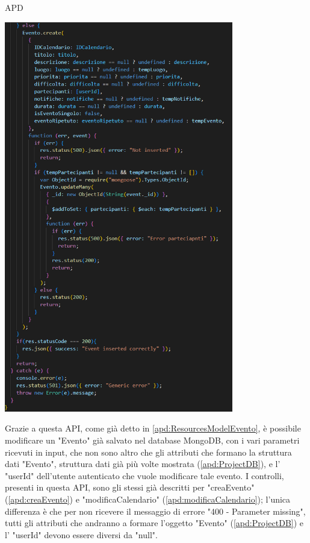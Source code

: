 \begin{listaPersonale} {APD}
\begin{listaPersonale2}[APD]{}
\begin{center}
                    \includegraphics[width=0.75\textwidth, height=0.9\textheight]{img/png/APIs/creaEvento3.png}
                \end{center}
                Grazie a questa API, come già detto in \ref{apd:ResourcesModelEvento}, è possibile modificare un "Evento" già salvato nel database MongoDB, con i vari parametri ricevuti in input, che non sono altro che gli attributi che formano la struttura dati "Evento", struttura dati già più volte mostrata (\ref{apd:ProjectDB}), e l' "userId" dell'utente autenticato che vuole modificare tale evento. I controlli, presenti in questa API, sono gli stessi già descritti per "creaEvento" (\ref{apd:creaEvento}) e "modificaCalendario" (\ref{apd:modificaCalendario}); l'unica differenza è che per non ricevere il messaggio di errore "400 - Parameter missing", tutti gli attributi che andranno a formare l'oggetto "Evento" (\ref{apd:ProjectDB}) e l' "userId" devono essere diversi da "null". \\

\end{listaPersonale2}
\end{listaPersonale}
